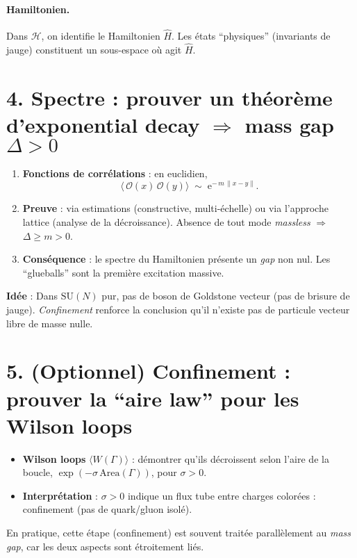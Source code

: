 \documentclass[11pt]{article}
\begin{document}
\paragraph{Hamiltonien.}
Dans \(\mathcal{H}\), on identifie le Hamiltonien \(\hat{H}\). Les états “physiques” (invariants de jauge) constituent un sous-espace où agit \(\hat{H}\).

\section*{4. Spectre : prouver un théorème d’exponential decay \texorpdfstring{\(\Rightarrow\)}{} mass gap \(\Delta>0\)}

\begin{enumerate}
  \item \textbf{Fonctions de corrélations} : en euclidien,
  \[
    \langle\,\mathcal{O}(x)\,\mathcal{O}(y)\rangle
    \;\sim\;
    \mathrm{e}^{-\,m\,\|x-y\|}.
  \]
  \item \textbf{Preuve} : via estimations (constructive, multi-échelle) ou via l’approche lattice (analyse de la décroissance). Absence de tout mode \emph{massless} \(\Rightarrow\) \(\Delta \ge m>0\).
  \item \textbf{Conséquence} : le spectre du Hamiltonien présente un \emph{gap} non nul. Les “glueballs” sont la première excitation massive.
\end{enumerate}

\noindent
\textbf{Idée} : Dans \(\mathrm{SU}(N)\) pur, pas de boson de Goldstone vecteur (pas de brisure de jauge). \emph{Confinement} renforce la conclusion qu’il n’existe pas de particule vecteur libre de masse nulle.

\section*{5. (Optionnel) Confinement : prouver la “aire law” pour les Wilson loops}

\begin{itemize}
  \item \textbf{Wilson loops} \(\langle W(\Gamma)\rangle\) : démontrer qu’ils décroissent selon l’aire de la boucle, \(\exp(-\sigma\,\mathrm{Area}(\Gamma))\), pour \(\sigma>0\).
  \item \textbf{Interprétation} : \(\sigma>0\) indique un flux tube entre charges colorées : confinement (pas de quark/gluon isolé).
\end{itemize}

\noindent
En pratique, cette étape (confinement) est souvent traitée parallèlement au \emph{mass gap}, car les deux aspects sont étroitement liés.
\end{document}
